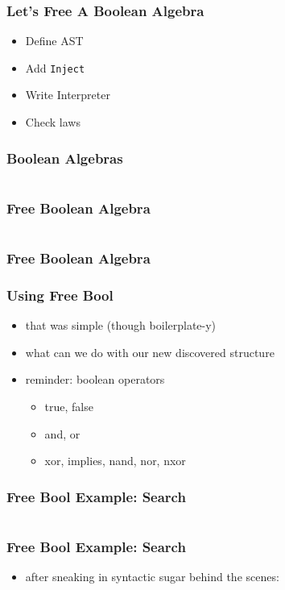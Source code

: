 \documentclass{beamer}
\newcommand{\recipe}{%
  \begin{itemize}
  \item Define AST
  \item Add \texttt{Inject}
  \item Write Interpreter
  \item Check laws
  \end{itemize}
}
\begin{document}
\begin{frame}
  \frametitle{Let's Free A Boolean Algebra}
  \recipe{}
\end{frame}

\begin{frame}
  \frametitle{Boolean Algebras}
  \inputminted{scala}{snippets/boolean-algebra.scala}
\end{frame}

\begin{frame}
  \frametitle{Free Boolean Algebra}
  \inputminted{scala}{snippets/free-bool.scala}
\end{frame}

\begin{frame}
  \frametitle{Free Boolean Algebra}
\end{frame}

\begin{frame}
  \frametitle{Using Free Bool}
  \begin{itemize}
  \item that was simple (though boilerplate-y)
  \item what can we do with our new discovered structure
  \item reminder: boolean operators
    \begin{itemize}
    \item true, false
    \item and, or
    \item xor, implies, nand, nor, nxor
    \end{itemize}
  \end{itemize}
\end{frame}

\begin{frame}
  \frametitle{Free Bool Example: Search}
  \inputminted{scala}{snippets/search-predicate.scala}
\end{frame}

\begin{frame}
  \frametitle{Free Bool Example: Search}
  \begin{itemize}
  \item after sneaking in syntactic sugar behind the scenes:
  \end{itemize}
  \inputminted{scala}{snippets/example-search-predicate.scala}
\end{frame}
\end{document}
